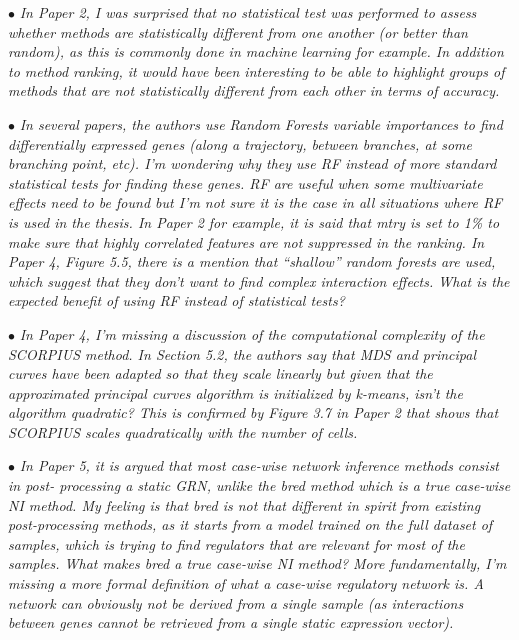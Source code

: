 \documentclass[10pt]{article}
\newcommand{\exam}[2][\  ]{\hspace{0pt}\marginpar{\color{red}#1}$\bullet$ \textit{#2}}
\newcommand{\imp}[1]{{\color{red} #1}}
\newcommand{\bigexclaim}{\raisebox{-0.1em}{\BigTriangleUp}\hspace{-0.32em}\llap{\small\textbf{!}}\hspace{0.32em}}
\newcommand{\tagimp}{\bigexclaim}
\begin{document}
{\exam[\tagimp]{\imp{In Paper 2, I was surprised that no statistical test was performed to assess whether methods
	are statistically different from one another} (or better than random), as this is commonly done
	in machine learning for example. In addition to method ranking, it would have been
	interesting to be able to highlight groups of methods that are not statistically different from
	each other in terms of accuracy.}

\exam[\tagimp]{In several papers, the authors use Random Forests variable importances to find differentially
	expressed genes (along a trajectory, between branches, at some branching point, etc). \imp{I’m
	wondering why they use RF instead of more standard statistical tests for finding these genes.}
	RF are useful when some multivariate effects need to be found but I’m not sure it is the case
	in all situations where RF is used in the thesis. In Paper 2 for example, it is said that mtry is
	set to 1\% to make sure that highly correlated features are not suppressed in the ranking. In
	Paper 4, Figure 5.5, there is a mention that “shallow” random forests are used, which suggest
	that they don’t want to find complex interaction effects. What is the expected benefit of
	using RF instead of statistical tests?}

\exam[\tagimp]{In Paper 4, \imp{I’m missing a discussion of the computational complexity of the SCORPIUS
	method.} In Section 5.2, the authors say that MDS and principal curves have been adapted so
	that they scale linearly but given that the approximated principal curves algorithm is
	initialized by k-means, isn’t the algorithm quadratic? This is confirmed by Figure 3.7 in
	Paper 2 that shows that SCORPIUS scales quadratically with the number of cells.}

\exam[\tagimp]{In Paper 5, it is argued that most case-wise network inference methods consist in post-
	processing a static GRN, unlike the bred method which is a true case-wise NI method. My
	feeling is that bred is not that different in spirit from existing post-processing methods, as it
	starts from a model trained on the full dataset of samples, which is trying to find regulators
	that are relevant for most of the samples. \imp{What makes bred a true case-wise NI method?}
	More fundamentally, \imp{I’m missing a more formal definition of what a case-wise regulatory
	network is.} A network can obviously not be derived from a single sample (as interactions
	between genes cannot be retrieved from a single static expression vector).}

}
\end{document}
